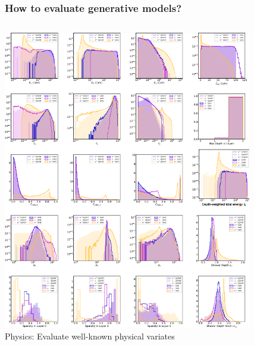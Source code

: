 \documentclass{beamer}
\begin{document}
\begin{frame}
    \frametitle{How to evaluate generative models?}

    \begin{columns}
        \begin{column}{0.5\textwidth}
            \begin{center}
                \includegraphics[width=0.85\textwidth]{figures/calogan-plots.png}\\
                \scriptsize Physics: Evaluate well-known physical variates
            \end{center}
        \end{column}
        \begin{column}{0.5\textwidth}
            \begin{center}

\end{center}
\end{column}
\end{columns}
\end{frame}
\end{document}
